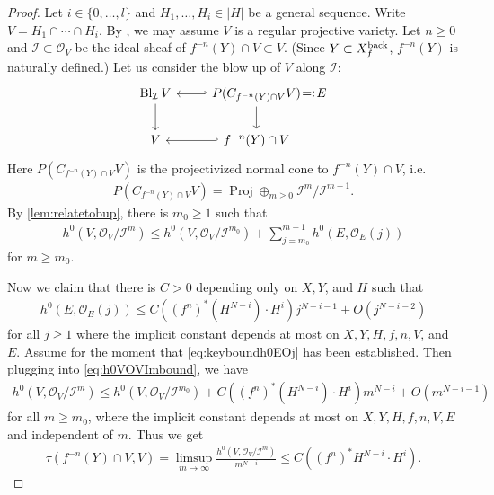 \documentclass[12pt]{amsart}
\theoremstyle{plain}
\theoremstyle{definition}
\numberwithin{equation}{section}
\def\O{{ \mathcal{O}}}
\def\I{{ \mathcal{I}}}
\DeclareMathOperator{\Proj}{Proj}
\DeclareMathOperator{\Bl}{Bl}
\begin{document}
\begin{proof}
Let $i \in \{0, \dots, l\}$ and $H_{1},\dots, H_{i} \in |H|$ be a general sequence.
Write $V = H_{1} \cap \cdots \cap H_{i}$.
By \cite[(3.4.10), Corollary 3.4.14]{joinintersec}, we may assume $V$ is a regular projective variety.
Let  $n \geq 0$ and $\I \subset \O_{V}$ be the ideal sheaf of $f^{-n}(Y) \cap V \subset V$.
(Since $Y \subset X_{f}^{\rm back}$, $f^{-n}(Y)$ is naturally defined.)
Let us consider the blow up of $V$ along $\I$:
\begin{equation}
\begin{tikzcd}
\Bl_{\I}V \arrow[d] \arrow[r,hookleftarrow] & P(C_{f^{-n}(Y)\cap V}V) \arrow[d] \arrow[r,phantom,"=:"] &[-2em]  E\\
V \arrow[r,hookleftarrow]  & f^{-n}(Y)\cap V  &
\end{tikzcd}
\end{equation}
Here $ P(C_{f^{-n}(Y)\cap V}V)$ is the projectivized normal cone to $f^{-n}(Y)\cap V$, i.e.
\begin{align}
P(C_{f^{-n}(Y)\cap V}V) = \Proj \oplus_{m \geq 0} \I^{m}/\I^{m+1}.
\end{align}
By \cref{lem:relatetobup}, there is $m_{0} \geq 1$ such that
\begin{align}
h^{0}(V, \O_{V} / \I^{m}) \leq h^{0}(V, \O_{V}/\I^{m_{0}}) + \sum_{j = m_{0}}^{m-1} h^{0}(E, \O_{E}(j)) \label{eq:h0VOVImbound}
\end{align}
for $m \geq m_{0}$.

Now we claim that there is $C > 0$ depending only on $X,Y$, and $H$ such that
\begin{align}
h^{0}(E, \O_{E}(j)) \leq C ((f^{n})^{*}(H^{N-i}) \cdot H^{i}) j^{N-i-1} + O(j^{N-i-2}) \label{eq:keyboundh0EOj}
\end{align}
for all $j \geq 1$ where the implicit constant depends at most on $X, Y, H, f, n, V$, and $E$.
Assume for the moment that \cref{eq:keyboundh0EOj} has been established.
Then plugging into \cref{eq:h0VOVImbound}, we have
\begin{align}
h^{0}(V, \O_{V}/\I^{m}) \leq h^{0}(V, \O_{V}/\I^{m_{0}}) + C ((f^{n})^{*}(H^{N-i}) \cdot H^{i}) m^{N-i} + O(m^{N-i-1})
\end{align}
for all $m \geq m_{0}$, where the implicit constant depends at most on $X, Y, H, f, n, V, E$ and independent of $m$.
Thus we get
\begin{align}
\tau(f^{-n}(Y) \cap V, V) = \limsup_{m \to \infty} \frac{h^{0}(V, \O_{V}/\I^{m})}{m^{N-i}} \leq C ((f^{n})^{*}H^{N-i} \cdot H^{i}).
\end{align}


\end{proof}
\end{document}
